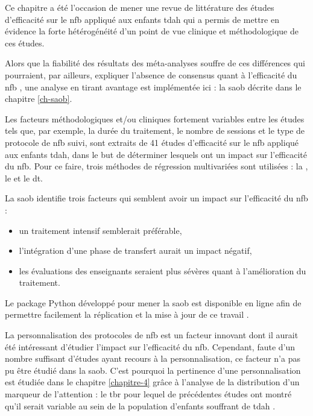 Ce chapitre a été l'occasion de mener une revue de littérature des études d'efficacité sur le \gls{nfb} appliqué aux enfants \gls{tdah} 
qui a permis de mettre en évidence la forte hétérogénéité d'un point de vue clinique et méthodologique de ces études. 

Alors que la fiabilité des résultats des méta-analyses souffre de ces différences qui pourraient, par ailleurs, expliquer l'absence de consensus quant 
à l'efficacité du \gls{nfb} \citep{Alkoby2017}, une analyse en tirant avantage est implémentée ici : la \gls{saob} décrite dans le chapitre \ref{ch-saob}. 

Les facteurs méthodologiques et/ou cliniques fortement variables entre les études tels que, par exemple, la durée du traitement, le nombre de sessions et le type 
de protocole de \gls{nfb} suivi, sont extraits de 41 études d'efficacité sur le \gls{nfb} appliqué aux enfants \gls{tdah}, dans le but de déterminer lesquels 
ont un impact sur l'efficacité du \gls{nfb}. Pour ce faire, trois méthodes de régression multivariées sont utilisées : la , le  et le \gls{dt}. 

La \gls{saob} identifie trois facteurs qui semblent avoir un impact sur l'efficacité du \gls{nfb} : 
\begin{itemize}
\item un traitement intensif semblerait préférable, 
\item l'intégration d'une phase de transfert aurait un impact négatif, 
\item les évaluations des enseignants seraient plus
sévères quant à l'amélioration du traitement. 
\end{itemize}

Le package Python développé pour mener la \gls{saob} est disponible en ligne afin de permettre facilement la réplication et la mise à jour 
de ce travail \citep{Bussalb2019c}. 

La personnalisation des protocoles de \gls{nfb} est un facteur innovant dont il aurait été intéressant d'étudier l'impact sur l'efficacité du \gls{nfb}.  
Cependant, faute d'un nombre suffisant d'études ayant recours à la personnalisation, ce facteur n'a pas pu être étudié dans la \gls{saob}. C'est pourquoi
la pertinence d'une personnalisation est étudiée dans le chapitre \ref{chapitre-4} grâce à l'analyse de la distribution d'un marqueur de l'attention : 
le \gls{tbr} pour lequel de précédentes études ont montré qu'il serait variable au sein de la population d'enfants souffrant de \gls{tdah} \citep{Zhang2017, Arns2013, Clarke2001}.

